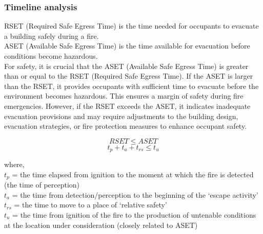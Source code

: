 \documentclass{article}
\begin{document}
\subsubsection*{Timeline analysis}
RSET (Required Safe Egress Time) is the time needed for occupants to evacuate a building safely during a fire. \\

ASET (Available Safe Egress Time) is the time available for evacuation before conditions become hazardous. \\

For safety, it is crucial that the ASET (Available Safe Egress Time) is greater than or equal to the RSET (Required Safe Egress Time). If the ASET is larger than the RSET, it provides occupants with sufficient time to evacuate before the environment becomes hazardous. This ensures a margin of safety during fire emergencies. However, if the RSET exceeds the ASET, it indicates inadequate evacuation provisions and may require adjustments to the building design, evacuation strategies, or fire protection measures to enhance occupant safety. 

$$RSET \leq  ASET$$
$$t_p + t_a + t_{rs} \leq t_u$$

where, \\$t_p$ = the time elapsed from ignition to the moment at which the fire is detected (the time of perception)\\
$t_a$ =  the time from detection/perception to the beginning of the ‘escape activity’\\
$t_{rs}$ = the time to move to a place of ‘relative safety’\\
$t_u$ = the time from ignition of the fire to the production of untenable conditions at the location under consideration (closely related to ASET)
\end{document}
